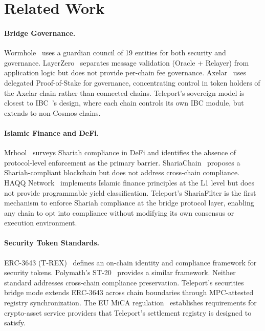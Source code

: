 \documentclass[11pt,twocolumn]{article}
\theoremstyle{definition}
\begin{document}
\section{Related Work}
\label{sec:related}

\paragraph{Bridge Governance.}
Wormhole~\cite{wormhole} uses a guardian council of 19 entities for both security and governance. LayerZero~\cite{layerzero} separates message validation (Oracle + Relayer) from application logic but does not provide per-chain fee governance. Axelar~\cite{axelar} uses delegated Proof-of-Stake for governance, concentrating control in token holders of the Axelar chain rather than connected chains. Teleport's sovereign model is closest to IBC~\cite{ibc}'s design, where each chain controls its own IBC module, but extends to non-Cosmos chains.

\paragraph{Islamic Finance and DeFi.}
Mrhool~\cite{mrhool2022} surveys Shariah compliance in DeFi and identifies the absence of protocol-level enforcement as the primary barrier. ShariaChain~\cite{shariachain2021} proposes a Shariah-compliant blockchain but does not address cross-chain compliance. HAQQ Network~\cite{haqq2023} implements Islamic finance principles at the L1 level but does not provide programmable yield classification. Teleport's ShariaFilter is the first mechanism to enforce Shariah compliance at the bridge protocol layer, enabling any chain to opt into compliance without modifying its own consensus or execution environment.

\paragraph{Security Token Standards.}
ERC-3643 (T-REX)~\cite{erc3643} defines an on-chain identity and compliance framework for security tokens. Polymath's ST-20~\cite{polymath2018} provides a similar framework. Neither standard addresses cross-chain compliance preservation. Teleport's securities bridge mode extends ERC-3643 across chain boundaries through MPC-attested registry synchronization. The EU MiCA regulation~\cite{mica2023} establishes requirements for crypto-asset service providers that Teleport's settlement registry is designed to satisfy.
\end{document}
